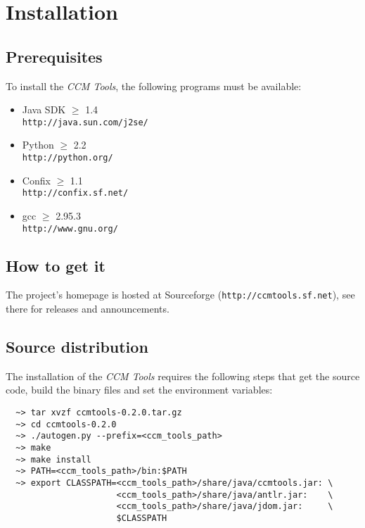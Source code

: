 
\chapter{Installation}

\section{Prerequisites}

To install the {\it CCM Tools}, the following programs must be available:
\begin{itemize}
\item Java SDK $\ge$ 1.4 \\
{\tt http://java.sun.com/j2se/}
\item Python $\ge$ 2.2 \\
{\tt http://python.org/}
\item Confix $\ge$ 1.1 \\
{\tt http://confix.sf.net/}
\item gcc $\ge$ 2.95.3 \\
{\tt http://www.gnu.org/}
\end{itemize}

\section{How to get it}

The project's homepage is hosted at Sourceforge ({\tt http://ccmtools.sf.net}),
see there for releases and announcements.



\section{Source distribution}

The installation of the {\it CCM Tools} requires the following steps that get
the source code, build the binary files and set the environment variables:
\begin{verbatim}
  ~> tar xvzf ccmtools-0.2.0.tar.gz
  ~> cd ccmtools-0.2.0
  ~> ./autogen.py --prefix=<ccm_tools_path>
  ~> make
  ~> make install
  ~> PATH=<ccm_tools_path>/bin:$PATH
  ~> export CLASSPATH=<ccm_tools_path>/share/java/ccmtools.jar: \
                      <ccm_tools_path>/share/java/antlr.jar:    \
                      <ccm_tools_path>/share/java/jdom.jar:     \
                      $CLASSPATH
\end{verbatim}




